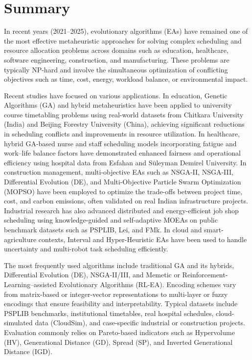 \documentclass[a4paper,12pt]{article}
\begin{document}
\section*{Summary}

In recent years (2021--2025), evolutionary algorithms (EAs) have remained one of the most effective metaheuristic approaches for solving complex scheduling and resource allocation problems across domains such as education, healthcare, software engineering, construction, and manufacturing. These problems are typically NP-hard and involve the simultaneous optimization of conflicting objectives such as time, cost, energy, workload balance, or environmental impact.

Recent studies have focused on various applications. In education, Genetic Algorithms (GA) and hybrid metaheuristics have been applied to university course timetabling problems using real-world datasets from Chitkara University (India) and Beijing Forestry University (China), achieving significant reductions in scheduling conflicts and improvements in resource utilization. In healthcare, hybrid GA-based nurse and staff scheduling models incorporating fatigue and work–life balance factors have demonstrated enhanced fairness and operational efficiency using hospital data from Esfahan and Süleyman Demirel University. In construction management, multi-objective EAs such as NSGA-II, NSGA-III, Differential Evolution (DE), and Multi-Objective Particle Swarm Optimization (MOPSO) have been employed to optimize the trade-offs between project time, cost, and carbon emissions, often validated on real Indian infrastructure projects. Industrial research has also advanced distributed and energy-efficient job shop scheduling using knowledge-guided and self-adaptive MOEAs on public benchmark datasets such as PSPLIB, Lei, and FMk. In cloud and smart-agriculture contexts, Interval and Hyper-Heuristic EAs have been used to handle uncertainty and multi-robot task scheduling efficiently.

The most frequently used algorithms include traditional GA and its hybrids, Differential Evolution (DE), NSGA-II/III, and Memetic or Reinforcement-Learning–assisted Evolutionary Algorithms (RL-EA). Encoding schemes vary from matrix-based or integer-vector representations to multi-layer or fuzzy encodings that ensure feasibility and interpretability. Typical datasets include PSPLIB benchmarks, institutional timetables, real hospital schedules, cloud-simulated data (CloudSim), and case-specific industrial or construction projects. Evaluation commonly relies on Pareto-based indicators such as Hypervolume (HV), Generational Distance (GD), Spread (SP), and Inverted Generational Distance (IGD).
\end{document}
